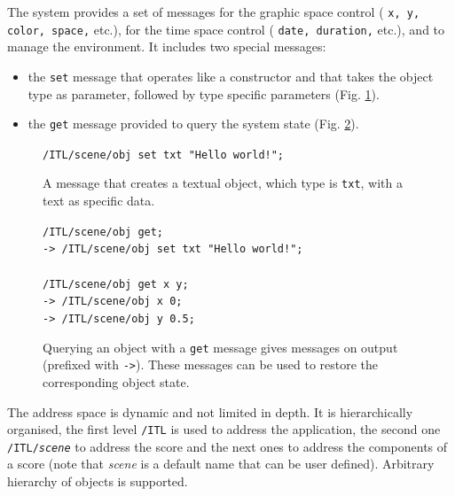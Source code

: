 \documentclass[11pt,a4paper]{article}
\newcommand{\OSC}[1]	{{\fontsize{10pt}{10pt} \selectfont\texttt{#1}}}
\newcommand{\tab}		{\hspace*{4mm}}
\newcommand{\sample}[1]	{\vspace{-0.2em}\begin{center}\colorbox{mygrey}{\begin{minipage}[t]{0.98\columnwidth} {\small \texttt{#1}}\end{minipage}}\end{center}}
\begin{document}
The system provides a set of messages for the graphic space control (\OSC{x, y, color, space,} etc.), for the time space control (\OSC{date, duration,} etc.), and to manage the environment. It includes two special messages:
\begin{itemize}
\item the \OSC{set} message that operates like a constructor and that takes the object type as parameter, followed by type specific parameters (Fig. \ref{fig:set}).
\item the \OSC{get} message provided to query the system state  (Fig. \ref{fig:get}).
\end{itemize}

\begin{figure}[ht]
\begin{center}
\sample{/ITL/scene/obj set txt "Hello world!";
}
\caption{A message that creates a textual object, which type is \OSC{txt}, with a text as specific data.}
\label{fig:set}
\end{center}
\end{figure}

\begin{figure}[ht]
\begin{center}
\sample{/ITL/scene/obj get;\\
\tab -> /ITL/scene/obj set txt "Hello world!";\\
\\
/ITL/scene/obj get x y;\\
\tab -> /ITL/scene/obj x 0;\\
\tab -> /ITL/scene/obj y 0.5;
}
\caption{Querying an object with a \OSC{get} message gives messages on output (prefixed with \OSC{->}). These messages can be used to restore the corresponding object state.}
\label{fig:get}
\end{center}
\end{figure}

The address space is dynamic and not limited in depth. It is hierarchically organised, the first level \OSC{/ITL} is used to address the application, the second one \OSC{/ITL/\textit{scene}} to address the score and the next ones to address the components of a score (note that \textit{scene} is a default name that can be user defined). Arbitrary hierarchy of objects is supported.

\end{document}
